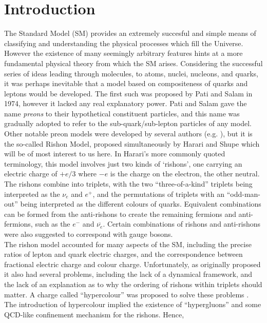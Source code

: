 \documentclass[twocolumn,showpacs,preprintnumbers,amsmath,amssymb]{revtex4}
\newcommand{\anti}[1]{\overline{#1}}
\begin{document}
\section{Introduction}
\label{sec:intro}
The Standard Model (SM) provides an extremely succesful and simple 
means of classifying and understanding the physical processes which fill the 
Universe. However the existence of many seemingly arbitrary features hints 
at a more fundamental physical theory from which the SM arises. Considering the 
successful series of ideas leading through molecules, to atoms, nuclei, nucleons, 
and quarks, it was perhaps inevitable that a model based on compositeness of 
quarks and leptons would be developed. The first such was 
proposed by Pati and Salam \cite{PatiSalam} in 1974, however it lacked any real 
explanatory power. Pati and Salam gave the name {\em preons} to their 
hypothetical constituent particles, and this name was gradually adopted to refer
to the sub-quark/sub-lepton particles of any model. Other notable preon models 
were developed by several authors (e.g. \cite{Akama}), but it is the 
so-called Rishon Model, proposed simultaneously by Harari and Shupe 
\cite{Harari,Shupe} which will be of most interest to us here. In Harari's more 
commonly quoted terminology, this model involves just two kinds of `rishons', one 
carrying an electric charge of $+e/3$ where $-e$ is the charge on the electron, 
the other neutral. The rishons combine into triplets, with the two 
``three-of-a-kind'' triplets being interpreted as the $\nu_e$ and $e^+$, and the 
permutations of triplets with an ``odd-man-out'' being interpreted as the different
colours of quarks. Equivalent combinations can be formed from the anti-rishons to 
create the remaining fermions and anti-fermions, such as the $e^-$ and 
$\anti{\nu_e}$. Certain combinations of rishons and anti-rishons were also 
suggested to correspond with gauge bosons. \\
The rishon model accounted for many aspects of the SM, including the precise ratios 
of lepton and quark electric charges, and the correspondence between fractional 
electric charge and colour charge. Unfortunately, as originally proposed it also 
had several problems, including the lack of a dynamical framework, and the lack of 
an explanation as to why the ordering of rishons within triplets should matter. 
A charge called ``hypercolour'' was proposed to solve these problems 
\cite{harari_seiberg}. The introduction of hypercolour implied the existence of 
``hypergluons'' and some QCD-like confinement mechanism for the rishons. Hence, 
\end{document}
